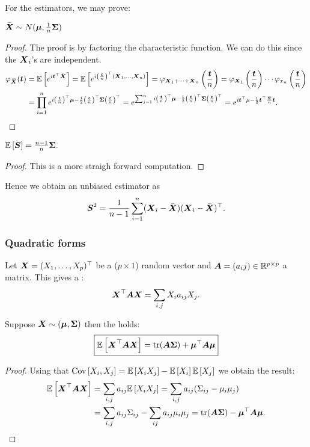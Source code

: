 For the estimators, we may prove:
\begin{proposition}
    $\bar{\boldsymbol{X}} \sim N(\boldsymbol{\mu}, \frac{1}{n}\boldsymbol{\Sigma})$
\end{proposition}
\begin{proof}
    The proof is by factoring the characteristic function. We can do this since the $\boldsymbol{X}_i$'s are independent.
    \begin{align*}
        \varphi_{\bar{\boldsymbol{X}}}(\boldsymbol{t}) 
        &= \mathbb{E}\left[e^{i \boldsymbol{t}^\top \bar{\boldsymbol{X}}}\right]
        = \mathbb{E}\left[ e^{i \left(\frac{\boldsymbol{t}}{n}\right)^\top (\boldsymbol{X}_1, \ldots, \boldsymbol{X}_n)} \right]
        = \varphi_{\boldsymbol{X}_1+\dots+\boldsymbol{X}_n} \left(\frac{\boldsymbol{t}}{n}\right)
        = \varphi_{\boldsymbol{X}_1} \left( \frac{\boldsymbol{t}}{n} \right) \cdots \varphi_{x_n} \left( \frac{\boldsymbol{t}}{n} \right)
        \\&= \prod_{i=1}^{n} e^{ i \left(\frac{\boldsymbol{t}}{n}\right)^\top\boldsymbol{\mu} - \frac{1}{2} \left(\frac{\boldsymbol{t}}{n}\right)^\top \boldsymbol{\Sigma} \left(\frac{\boldsymbol{t}}{n}\right)^\top }
        = e^{\sum_{j=1}^{n} i \left(\frac{\boldsymbol{t}}{n}\right)^\top\boldsymbol{\mu} - \frac{1}{2} \left(\frac{\boldsymbol{t}}{n}\right)^\top \boldsymbol{\Sigma} \left(\frac{\boldsymbol{t}}{n}\right)^\top}
        = e^{ i \boldsymbol{t}^\top \mu - \frac{1}{2} \boldsymbol{t}^\top \frac{\boldsymbol{\Sigma}}{n} \boldsymbol{t} }.
    \end{align*}

\end{proof}
\begin{proposition}
    $\mathbb{E}\left[\boldsymbol{S}\right] = \frac{n-1}{n} \boldsymbol{\Sigma}.$
\end{proposition}
\begin{proof}
    This is a more straigh forward computation.
\end{proof}
Hence we obtain an unbiased estimator as
$$
    \boldsymbol{S}^2 = \frac{1}{n-1} \sum_{i=1}^n (\boldsymbol{X}_i-\bar{\boldsymbol{X}})(\boldsymbol{X}_i-\bar{\boldsymbol{X}})^\top.
$$

\subsubsection{Quadratic forms}
Let $\boldsymbol{X}=(X_1,\dots,X_p)^\top$ be a ($p\times 1$) random vector and $\boldsymbol{A}=(a_ij)\in\mathbb{R}^{p\times p}$ a matrix. This gives a :
$$
    \boldsymbol{X}^\top\boldsymbol{A}\boldsymbol{X} = \sum_{i,j} X_ia_{ij}X_j.
$$ 
\begin{theorem} Suppose $\boldsymbol{X}\sim (\boldsymbol{\mu}, \boldsymbol{\Sigma})$ then the  holds:
    \begin{equation}
        \boxed{\mathbb{E}\left[\boldsymbol{X}^\top\boldsymbol{A}\boldsymbol{X}\right] = \mathrm{tr}(\boldsymbol{A\Sigma}) + \boldsymbol{\mu}^\top\boldsymbol{A}\boldsymbol{\mu}
       } 
    \end{equation}
\end{theorem} 
\begin{proof}
    Using that $\mathrm{Cov}\left[X_i,X_j\right] = \mathbb{E}\left[X_iX_j\right]-\mathbb{E}\left[X_i\right]\mathbb{E}\left[X_j\right]$ we obtain the result:
    \begin{align*}
        \mathbb{E}\left[\boldsymbol{X}^\top\boldsymbol{A}\boldsymbol{X}\right]
        &= \sum_{i,j}a_{ij}\mathbb{E}\left[X_iX_j\right]
        = \sum_{i,j}a_{ij}(\Sigma_{ij}-\mu_i\mu_j)
        \\&= \sum_{i,j}a_{ij}\Sigma_{ij} -  \sum_{ij}a_{ij}\mu_i\mu_j
        = \mathrm{tr}(\boldsymbol{A}\boldsymbol{\Sigma}) - \boldsymbol{\mu}^\top\boldsymbol{A}\boldsymbol{\mu}.
    \end{align*}
\end{proof}

